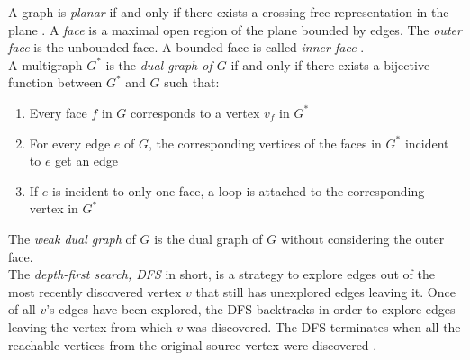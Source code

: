 A graph is \emph{planar} if and only if there exists a crossing-free representation in the plane \cite[Page 100]{DBLP:cormen_intro_to_algorithms}.
A \emph{face} is a maximal open region of the plane bounded by edges. The \emph{outer face} is the unbounded face. A bounded face is called \emph{inner face} \cite[S. 86]{Diestel_GraphTheory}.\\
A multigraph $G^*$ is the \emph{dual graph of $G$} if and only if there exists a bijective function between $G^*$ and $G$ such that:
\begin{enumerate}
	\item Every face $f$ in $G$ corresponds to a vertex $v_f$ in $G^*$
	\item For every edge $e$ of $G$, the corresponding vertices of the faces in $G^*$ incident to $e$ get an edge 
	\item If $e$ is incident to only one face, a loop is attached to the corresponding vertex in $G^*$
\end{enumerate}\cite[P. 103]{Diestel_GraphTheory}
The \emph{weak dual graph} of $G$ is the dual graph of $G$ without considering the outer face.\\
The \emph{depth-first search, DFS} in short, is a strategy to explore edges out of the most recently discovered vertex $v$ that still has unexplored edges leaving it. Once of all $v$'s edges have been explored, the DFS backtracks in order to explore edges leaving the vertex from which $v$ was discovered. The DFS terminates when all the reachable vertices from the original source vertex were discovered \cite[P.603]{DBLP:cormen_intro_to_algorithms}.


